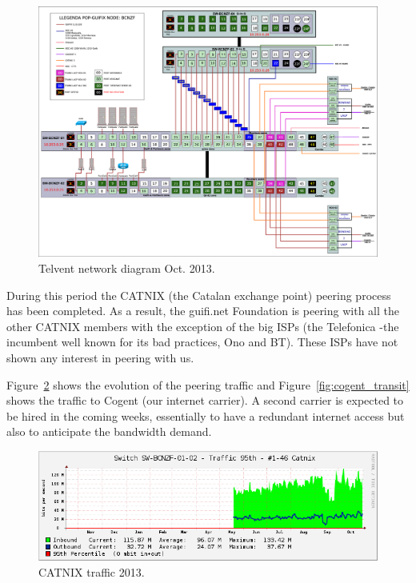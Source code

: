 \begin{figure}[H]
  \centering
  \includegraphics[width=0.95\linewidth]{sect3/figures/telvent_diagram.eps} 
  \caption[Telvent network diagram]{Telvent network diagram Oct. 2013.}
  \label{fig:telvent_diagram}
\end{figure}


During this period the CATNIX (the Catalan exchange point) peering process has been completed. As a result, the guifi.net Foundation is peering with all the other CATNIX members with the exception of the big ISPs (the Telefonica -the incumbent well known for its bad practices, Ono and BT). These ISPs have not shown any interest in peering with us.

Figure~\ref{fig:catnix_transit} shows the evolution of the peering traffic and Figure~\ref{fig:cogent_transit} shows the traffic to Cogent (our internet carrier). A second carrier is expected to be hired in the coming weeks, essentially to have a redundant internet access but also to anticipate the bandwidth demand.

\begin{figure}[H]
  \centering
  \includegraphics[width=0.95\linewidth]{sect3/figures/catnix.png} 
  \caption[CATNIX traffic 2013]{CATNIX traffic 2013.}
  \label{fig:catnix_transit}
\end{figure}

